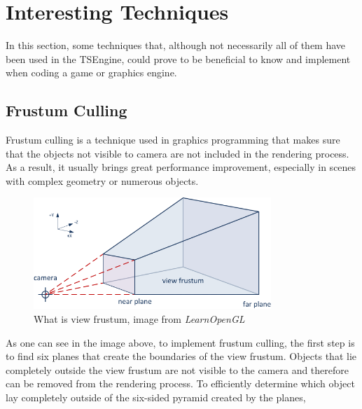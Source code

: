 \newpage
\section{Interesting Techniques}
\hspace{\parindent}
In this section, some techniques that, although not necessarily all of them have been used in the TSEngine, could prove to be beneficial to know and implement when coding a game or graphics engine.

\subsection{Frustum Culling}
\hspace{\parindent}
Frustum culling is a technique used in graphics programming that makes sure that the objects  not visible to camera are not included in the rendering process. As a result, it usually brings great performance improvement, especially in scenes with  complex geometry or numerous objects.
\begin{figure}[H]
    \begin{center}
    \includegraphics[width=0.8\textwidth]{figures/VisualCameraFrustum.png}
    \end{center}
    \caption{What is view frustum, image from \textit{LearnOpenGL} \cite{learnopengl} }
\end{figure}
As one can see in the image above, to implement frustum culling, the first step is to find six planes that create the boundaries of the view frustum. Objects that lie completely outside the view frustum are not visible to the camera and therefore can be removed from the rendering process. To efficiently determine which object lay completely outside of the six-sided pyramid created by the planes,

